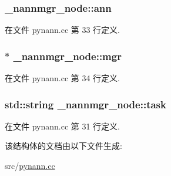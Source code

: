 \subsubsection[{ann}]{ \+\_\+nannmgr\+\_\+node\+::ann}\label{struct__nannmgr__node_a610ea5ea6fe3cff8a7554ccff7a10f5d}


在文件 pynann.\+cc 第 33 行定义.

\hypertarget{struct__nannmgr__node_a26300b0fc49531f10ecf0adbc4395095}{}
\subsubsection[{mgr}]{$\ast$ \+\_\+nannmgr\+\_\+node\+::mgr}\label{struct__nannmgr__node_a26300b0fc49531f10ecf0adbc4395095}


在文件 pynann.\+cc 第 34 行定义.

\hypertarget{struct__nannmgr__node_af36c967eb949e00426e4b5ebfed4553d}{}
\subsubsection[{task}]{\setlength{\rightskip}{0pt plus 5cm}std\+::string \+\_\+nannmgr\+\_\+node\+::task}\label{struct__nannmgr__node_af36c967eb949e00426e4b5ebfed4553d}


在文件 pynann.\+cc 第 31 行定义.



该结构体的文档由以下文件生成\+:\begin{DoxyCompactItemize}
\item 
src/\hyperlink{pynann_8cc}{pynann.\+cc}\end{DoxyCompactItemize}
